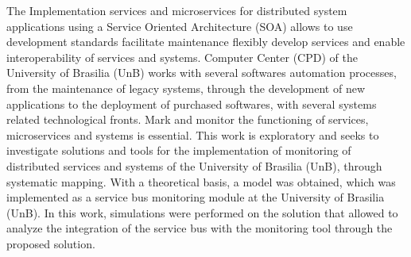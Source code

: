 The Implementation services and microservices for distributed system applications using a Service Oriented Architecture (SOA) allows to use development standards facilitate maintenance flexibly develop services and enable interoperability of services and systems. Computer Center (CPD) of the University of Brasilia (UnB) works with several softwares automation processes, from the maintenance of legacy systems, through the development of new applications to the deployment of purchased softwares, with several systems related technological fronts. Mark and monitor the functioning of services, microservices and systems is essential. This work is exploratory and seeks to investigate solutions and tools for the implementation of monitoring of distributed services and systems of the University of Brasilia (UnB), through systematic mapping. With a theoretical basis, a model was obtained, which was implemented as a service bus monitoring module at the University of Brasilia (UnB). In this work, simulations were performed on the solution that allowed to analyze the integration of the service bus with the monitoring tool through the proposed solution.